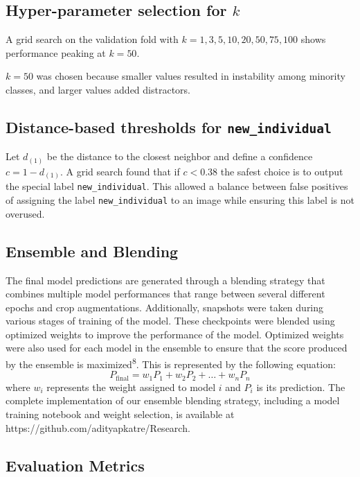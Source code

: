 \documentclass[twocolumn]{article}
\begin{document}
\subsection{Hyper-parameter selection for $k$}

A grid search on the validation fold with $k\!=\!1,3,5,10,20,50,75,100$ shows performance peaking at $k=50$. 

$k=50$ was chosen because smaller values resulted in instability among minority classes, and larger values added distractors.

\subsection{Distance-based thresholds for \texttt{new_individual}}

Let $d_{(1)}$ be the distance to the closest neighbor and define a confidence $c = 1 - d_{(1)}$.
A grid search found that if $c < 0.38$ the safest choice is to output
the special label \texttt{new\_individual}.
This allowed a balance between false positives of assigning the label \texttt{new_individual} to an image while ensuring this label is not overused.

\subsection{Ensemble and Blending}

The final model predictions are generated through a blending strategy that combines multiple model performances that range between several different epochs and crop augmentations. Additionally, snapshots were taken during various stages of training of the model. These checkpoints were blended using optimized weights to improve the performance of the model. Optimized weights were also used for each model in the ensemble to ensure that the score produced by the ensemble is maximized\textsuperscript{8}. This is represented by the following equation:
\[
P_{\text{final}} = w_1 P_1 + w_2 P_2 + \dots + w_n P_n
\]
 where $w_i$ represents the weight assigned to model $i$ and $P_i$ is its prediction. The complete implementation of our ensemble blending strategy, including a model training notebook and weight selection, is available at https://github.com/adityapkatre/Research.

\subsection{Evaluation Metrics}
\end{document}
